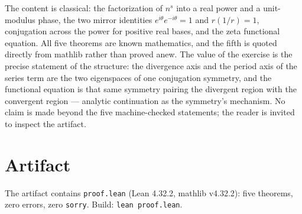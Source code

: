 \documentclass[sigplan,10pt,anonymous,review]{acmart}
\begin{document}
The content is classical: the factorization of $n^s$ into a real power
and a unit-modulus phase, the two mirror identities
$e^{i\theta}e^{-i\theta} = 1$ and $r(1/r) = 1$, conjugation across the
power for positive real bases, and the zeta functional equation. All
five theorems are known mathematics, and the fifth is quoted directly
from mathlib rather than proved anew. The value of the exercise is the
precise statement of the structure: the divergence axis and the period
axis of the series term are the two eigenspaces of one conjugation
symmetry, and the functional equation is that same symmetry pairing
the divergent region with the convergent region --- analytic
continuation as the symmetry's mechanism. No claim is made beyond the
five machine-checked statements; the reader is invited to inspect the
artifact.

\section*{Artifact}

The artifact contains \texttt{proof.lean} (Lean 4.32.2, mathlib
v4.32.2): five theorems, zero errors, zero \texttt{sorry}. Build:
\texttt{lean proof.lean}.
\end{document}
